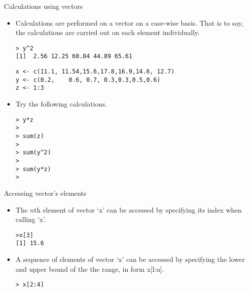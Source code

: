 \begin{frame}[fragile]{Calculations using vectors}

\begin{itemize}
\item Calculations are performed on a vector on a case-wise basis.
That is to say, the calculations are carried out on each element individually.
\begin{verbatim}
> y^2
[1]  2.56 12.25 60.84 44.89 65.61
\end{verbatim}

\begin{framed}
\begin{verbatim}
x <- c(11.1, 11.54,15.6,17.8,16.9,14.6, 12.7)
y <- c(0.2,    0.6, 0.7, 0.3,0.3,0.5,0.6)
z <- 1:3
\end{verbatim}
\end{framed}

\end{itemize}
\begin{itemize}
\item Try the following calculations.
\begin{verbatim}
> y*z
>
> sum(z)
>
> sum(y^2)
>
> sum(y*z)
>
\end{verbatim}
\end{itemize}
\end{frame}
\begin{frame}[fragile]{Accessing vector's elements}

\begin{itemize}
\item The $n$th element of vector `x' can be accessed by
specifying its index when calling `x'.
\begin{verbatim}
>x[3]
[1] 15.6
\end{verbatim}

\item A sequence of  elements of vector `x' can be accessed by
specifying the lower and upper bound of the the range, in form
x[l:u].
\begin{verbatim}
> x[2:4]
\end{verbatim}
\end{itemize}
\end{frame}



